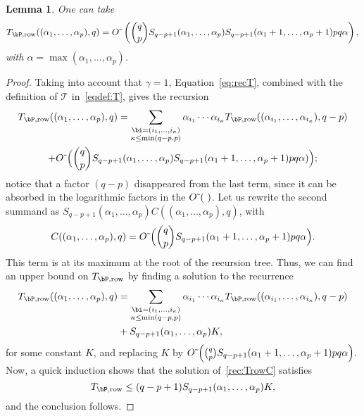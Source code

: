 \documentclass[12pt]{article}
\newtheorem{lemma}[definition]{Lemma}
\begin{document}
\begin{lemma}\label{lemma:TMrow}
  One can take
  $$T_{\bP,{\rm row}}((\alpha_1,\dots,\alpha_p),q)= \softO\left ({q
    \choose p} S_{q-p+1}(\alpha_1,\dots,\alpha_p) S_{q-p+1}(\alpha_1+1,\dots,\alpha_p+1) pq \alpha \right), $$ with
 $\alpha =\max(\alpha_1,\dots,\alpha_p)$.
\end{lemma}
\begin{proof}
  Taking into account that $\gamma=1$, Equation~\eqref{eq:recT},
  combined with the definition of $\mathscr{T}$ in~\eqref{eqdef:T}, gives the
  recursion
  \begin{multline}
  T_{\bP,{\rm row}}((\alpha_1,\dots,\alpha_p),q)=
\sum_{\substack{\bi=(i_1,\dots,i_\kappa)\\ \kappa\le\min(q-p,p)}}
\alpha_{i_1} \cdots \alpha_{i_\kappa} T_{\bP,{\rm row}}((\alpha_{i_1},\dots,\alpha_{i_\kappa}), q-p)
\\ + \softO\Big(
 {q \choose p} S_{q-p+1}(\alpha_1,\dots,\alpha_p) S_{q-p+1}(\alpha_1+1,\dots,\alpha_p+1) p q  \alpha )
\Big);
  \end{multline}
notice that 
a factor $(q-p)$ disappeared from the last term, since
it can be absorbed in the logarithmic factors in the $\softO(\ )$.
Let us rewrite the second summand as 
$S_{q-p+1}(\alpha_1,\dots,\alpha_p) C((\alpha_1,\dots,\alpha_p),q)$,
with
\[
C((\alpha_1,\dots,\alpha_p),q)= {O}{\,\tilde{ }\,}\Big(
 {q \choose p} S_{q-p+1}(\alpha_1+1,\dots,\alpha_p+1) p q  \alpha 
\Big).
\]
This term is at its maximum at
  the root of the recursion tree.  Thus, we can find an upper bound on
  $T_{\bP,{\rm row}}$ by finding a solution to the recurrence
  \begin{align}\label{rec:TrowC}
  T_{\bP,{\rm row}}((\alpha_1,\dots,\alpha_p),q)&=
\sum_{\substack{\bi=(i_1,\dots,i_\kappa)\\ \kappa\le\min(q-p,p)}}
\alpha_{i_1} \cdots \alpha_{i_\kappa} T_{\bP,{\rm row}}((\alpha_{i_1},\dots,\alpha_{i_\kappa}), q-p)\\
&+ S_{q-p+1}(\alpha_1,\dots,\alpha_p) K,
  \end{align}
  for some constant $K$, and replacing $K$ by $
 {O}{\,\tilde{ }\,}\Big(
 {q \choose p} S_{q-p+1}(\alpha_1+1,\dots,\alpha_p+1) p q  \alpha 
\Big). $  Now, a quick induction shows
that the   solution of~\eqref{rec:TrowC} satisfies 
$$T_{\bP,{\rm row}} \le   (q-p+1) S_{q-p+1} 
(\alpha_1,\dots,\alpha_p)K,$$  and the conclusion follows.
\end{proof}
\end{document}
